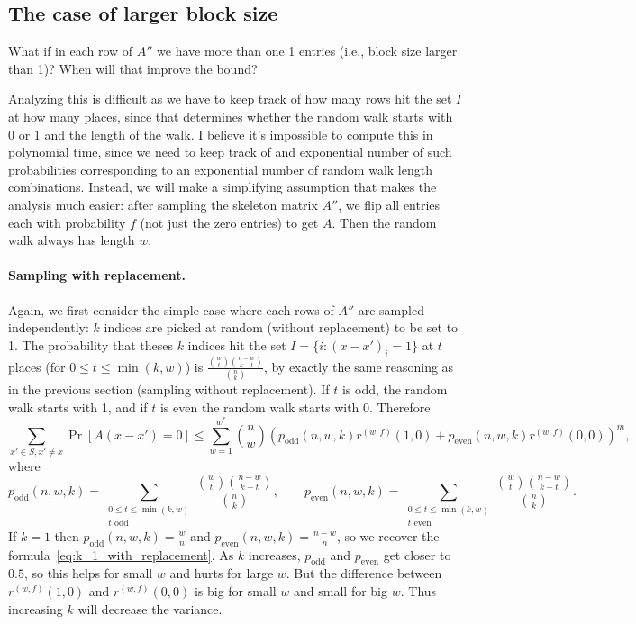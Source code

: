 \documentclass[11pt]{article}
\begin{document}
\subsection{The case of larger block size}
\label{subsec:block_size_larger}

What if in each row of $A''$ we have more than one 1 entries (i.e., block size
larger than 1)?
When will that improve the bound?

Analyzing this is difficult as we have to keep track of how many rows hit the
set $I$ at how many places, since that determines whether the random walk starts
with 0 or 1 and the length of the walk.
I believe it's impossible to compute this in polynomial time, since we need to
keep track of and exponential number of such probabilities corresponding to an
exponential number of random walk length combinations.
Instead, we will make a simplifying assumption that makes the analysis much
easier: after sampling the skeleton matrix $A''$, we flip all entries each with
probability $f$ (not just the zero entries) to get $A$.
Then the random walk always has length $w$.

\paragraph{Sampling with replacement.}
Again, we first consider the simple case where each rows of $A''$ are sampled
independently: $k$ indices are picked at random (without replacement) to be set
to 1.
The probability that theses $k$ indices hit the set $I = \{ i \colon (x - x')_i
= 1 \}$ at $t$ places (for $0 \leq t \leq \min(k, w)$) is $\frac{\binom{w}{t} \binom{n
    - w}{k - t}}{\binom{n}{k}}$, by exactly the same reasoning as in the
previous section (sampling without replacement). 
If $t$ is odd, the random walk starts with 1, and if $t$ is even the random walk
starts with 0.
Therefore
\begin{equation*}
  \sum_{x' \in S, x' \neq x} \Pr[A(x - x') = 0] \leq \sum_{w=1}^{w^*} \binom{n}{w} \left(
    p_\mathrm{odd}(n, w, k) r^{(w, f)}(1, 0) + p_\mathrm{even}(n, w, k)
    r^{(w, f)}(0, 0)\right)^m, 
  \label{eq:k_large_with_replacement}
\end{equation*}
where
\begin{equation*}
  p_\mathrm{odd}(n, w, k) = \sum_{\substack{0 \leq t \leq \min(k, w) \\ t \text{ odd}}} \frac{\binom{w}{t}
        \binom{n-w}{k-t}}{\binom{n}{k}}, \qquad
  p_\mathrm{even}(n, w, k) = \sum_{\substack{0 \leq t \leq \min(k, w) \\ t \text{ even}}} \frac{\binom{w}{t}
        \binom{n-w}{k-t}}{\binom{n}{k}}.
\end{equation*}
If $k = 1$ then $p_\mathrm{odd}(n, w, k) = \frac{w}{n}$ and
$p_\mathrm{even}(n, w, k) = \frac{n - w}{n}$, so we recover the formula~\eqref{eq:k_1_with_replacement}.
As $k$ increases, $p_\mathrm{odd}$ and $p_\mathrm{even}$ get closer to $0.5$, so
this helps for small $w$ and hurts for large $w$.
But the difference between $r^{(w, f)}(1, 0)$ and $r^{(w, f)}(0, 0)$ is big for
small $w$ and small for big $w$.
Thus increasing $k$ will decrease the variance.
\end{document}

